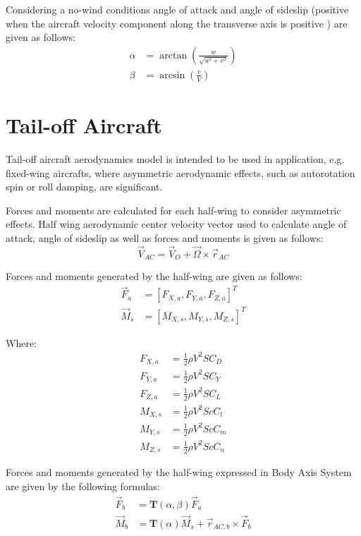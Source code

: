 Considering a no-wind conditions angle of attack and angle of sideslip (positive when the aircraft velocity component along the transverse axis is positive \cite{ISO-1151-1-1988}) are given as follows:
\begin{align}
  \alpha &= \arctan \left( \frac{w}{ \sqrt{ u^2 + v^2 } } \right) \\
  \beta  &= \arcsin \left( \frac{v}{V} \right)
\end{align}

\section{Tail-off Aircraft}

Tail-off aircraft aerodynamics model is intended to be used in application, e.g. fixed-wing aircrafts, where asymmetric aerodynamic effects, such as autorotation spin or roll damping, are significant.

Forces and moments are calculated for each half-wing to consider asymmetric effects. Half wing aerodynamic center velocity vector used to calculate angle of attack, angle of sideslip as well as forces and moments is given as follows:
\begin{equation}
  \label{eq-aero-v-ac}
  {\vec V}_{AC} = {\vec V}_O + {\vec \Omega} \times {\vec r}_{AC}
\end{equation}

Forces and moments generated by the half-wing are given as follows: \cite{StevensLewis1992}
\begin{align}
  {\vec F}_a &= \left[ F_{X,a}, F_{Y,a}, F_{Z,a} \right]^T \\
  {\vec M}_s &= \left[ M_{X,s}, M_{Y,s}, M_{Z,s} \right]^T
\end{align}

Where:
\begin{align}
  \label{eq-aero-fxa}
  F_{X,a} &= \frac{1}{2} \rho V^2 S C_D \\
  \label{eq-aero-fya}
  F_{Y,a} &= \frac{1}{2} \rho V^2 S C_Y \\
  \label{eq-aero-fza}
  F_{Z,a} &= \frac{1}{2} \rho V^2 S C_L \\
  M_{X,s} &= \frac{1}{2} \rho V^2 S c C_l \\
  M_{Y,s} &= \frac{1}{2} \rho V^2 S c C_m \\
  M_{Z,s} &= \frac{1}{2} \rho V^2 S c C_n
\end{align}

Forces and moments generated by the half-wing expressed in Body Axis System are given by the following formulas:
\begin{align}
  \label{eq-aero-fb}
  {\vec F}_b &= {\boldsymbol T} \left( \alpha, \beta \right) {\vec F}_a \\
  {\vec M}_b &=
  {\boldsymbol T} \left( \alpha \right) {\vec M}_s
  +
  {\vec r}_{AC,b} \times {\vec F}_b
\end{align}

